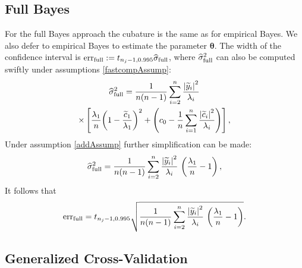 \documentclass[twocolumn]{svjour3}          %
\newcommand{\bm}[1]{\boldsymbol{#1}}
\newcommand{\vtheta}{{\bm{\theta}}}
\newcommand{\hsigma}{\widehat{\sigma}}
\newcommand{\err}{\textup{err}}
\def\abs#1{\ensuremath{\left \lvert #1 \right \rvert}}
\begin{document}
\subsection{Full Bayes}
For the full Bayes approach the cubature is the same as for empirical Bayes.  We also defer to empirical Bayes to estimate the parameter $\vtheta$.  The width of the confidence interval is $\err_{\textup{full}} 
:= t_{n_j-1,0.995} \hsigma_{\textup{full}}$, where $\hsigma_{\textup{full}}^2$ can also be computed swiftly under assumptions \eqref{fastcompAssump}:
\begin{multline*} %
\widehat{\sigma}^2_{\textup{full}}
=
\frac{1}{n(n-1)} \sum_{i=2}^n \frac{\abs{\widetilde{y}_i}^2}{\lambda_i}
\\
\times
\left[\frac{\lambda_1}{n}{\left(1 - \frac{\widetilde{c}_1}{\lambda_1}\right)^2} + \left(c_0  - \frac 1n \sum_{i=1}^n \frac{\abs{\widetilde{c}_i}^2}{\lambda_i}\right) \right],
\end{multline*}
Under assumption \eqref{addAssump} further simplification can be made:
\begin{equation*} %
\widehat{\sigma}^2_{\textup{full}}
=
\frac{1}{n(n-1)} \sum_{i=2}^n \frac{\abs{\widetilde{y}_i}^2}{\lambda_i} \, \left(\frac{\lambda_1}{n}  - 1  \right),
\end{equation*}
It follows that
\begin{equation} \label{FJH:eq:errFullSimple}
\err_{\textup{full}}
=
t_{n_j-1,0.995}
\sqrt{\frac{1}{n(n-1)} \sum_{i=2}^n \frac{\abs{\widetilde{y}_i}^2}{\lambda_i} \, \left(\frac{\lambda_1}{n}  - 1  \right)}.
\end{equation}


\subsection{Generalized Cross-Validation}
\end{document}
